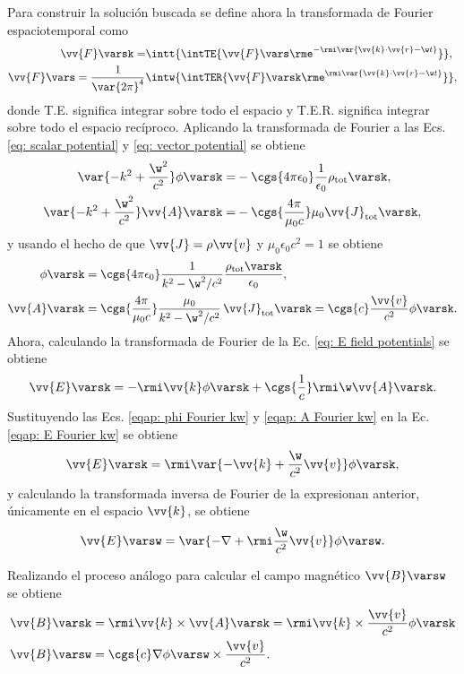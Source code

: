 Para construir la solución buscada se define ahora la transformada de Fourier espaciotemporal como
\begin{align}
\vv{F}\varsk = &\intt{\intTE{ \vv{F}\vars \rme^{-\rmi \var{\vv{k}\cdot\vv{r}-\w t}} }},\nonumber \\
\vv{F}\vars = \frac{1}{\var{2\pi}^4}&\intw{\intTER{ \vv{F}\varsk \rme^{\rmi\var{\vv{k}\cdot\vv{r}-\w t}} }},
\end{align}
donde T.E. significa integrar sobre todo el espacio y T.E.R. significa integrar sobre todo el espacio recíproco. Aplicando la transformada de Fourier a las Ecs. \eqref{eq: scalar potential} y \eqref{eq: vector potential} se obtiene 
\begin{align}
\var{-k^2+\frac{\w^2}{c^2}}\phi\varsk =& -\cgs{4\pi\epsilon_0}\frac{1}{\epsilon_0}\rho_{\text{tot}}\varsk, \\
\var{-k^2+\frac{\w^2}{c^2}}\vv{A}\varsk =& - \cgs{\frac{4\pi}{\mu_0 c}}\mu_0\vv{J}_{\text{tot}}\varsk, 
\end{align}
y usando el hecho de que $\vv{J} = \rho \vv{v}$ y $\mu_0 \epsilon_0 c^2 = 1$ se obtiene
\begin{align}
\phi\varsk &= \cgs{4\pi\epsilon_0}\frac{1}{k^2-\w^2/c^2} \frac{\rho_{\rm tot}\varsk}{\epsilon_0}, \label{eqap: phi Fourier kw} \\
\vv{A}\varsk &= \cgs{\frac{4\pi}{\mu_0 c}}\frac{\mu_0}{k^2-\w^2/c^2}\,\vv{J}_{\text{tot}}\varsk = \cgs{c}\frac{\vv{v}}{c^2}\phi\varsk. \label{eqap: A Fourier kw}
\end{align}
Ahora, calculando la transformada de Fourier de la Ec. \eqref{eq: E field potentials} se obtiene 
\begin{equation}
\vv{E}\varsk = - \rmi \vv{k} \phi\varsk + \cgs{\frac{1}{c}}\rmi \w \vv{A}\varsk \label{eqap: E Fourier kw}.
\end{equation}
Sustituyendo las Ecs. \eqref{eqap: phi Fourier kw} y \eqref{eqap: A Fourier kw} en la Ec. \eqref{eqap: E Fourier kw} se obtiene
\begin{equation}
\vv{E}\varsk = \rmi \var{-\vv{k}+\frac{\w}{c^2}\vv{v}}\phi\varsk, 
\end{equation}
y calculando la transformada inversa de Fourier de la expresionan anterior, únicamente en el espacio $\vv{k}$, se obtiene
\begin{equation}
\vv{E}\varsw = \var{-\nabla+\rmi \frac{\w}{c^2}\vv{v}}\phi\varsw.
\end{equation}

Realizando el proceso análogo para calcular el campo magnético $\vv{B}\varsw$ se obtiene
\begin{align}
\vv{B}\varsk &= \rmi \vv{k}\times\vv{A}\varsk = \rmi \vv{k}\times\frac{\vv{v}}{c^2}\phi\varsk\\
\vv{B}\varsw &= \cgs{c}\nabla \phi\varsw\times\frac{\vv{v}}{c^2}.
\end{align}

